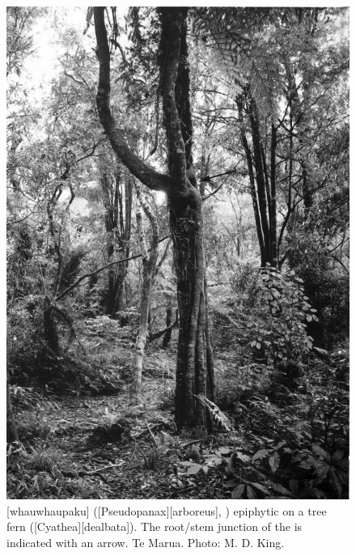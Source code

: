 \begin{figure}[t]
	\begin{minipage}[t]{\textwidth}
		\begin{minipage}[t]{(\textwidth-\fgap) * \real{0.522}}
			\centering
			\includegraphics[width=\textwidth]{graphics/fig_055}
			\caption[Whauwhaupaku epiphytic on a tree fern]{[whauwhaupaku] ([Pseudopanax][arboreus], ) epiphytic on a tree fern ([dealbata]). The root/stem junction of the  is indicated with an arrow. Te Marua. Photo:  M. D. King.}%
			\label{fig:55fivefinger}
		\end{minipage}\hspace{\fgap}%
		\begin{minipage}[t]{(\textwidth-\fgap) * \real{0.478}}

\end{minipage}
\end{minipage}
\end{figure}
